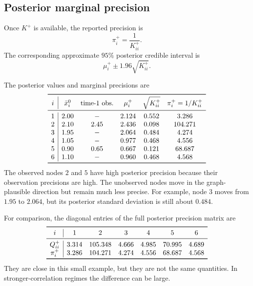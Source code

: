 \documentclass[11pt]{article}
\numberwithin{equation}{section}
\begin{document}
\subsection{Posterior marginal precision}

Once $K^+$ is available, the reported precision is
\begin{equation}
  \boxed{\pi_i^+=\frac{1}{K^+_{ii}}.}
  \label{eq:marginal-precision-final}
\end{equation}
The corresponding approximate $95\%$ posterior credible interval is
\begin{equation}
  \mu_i^+\pm1.96\sqrt{K^+_{ii}}.
  \label{eq:credible-interval}
\end{equation}

\begin{runningexample}
The posterior values and marginal precisions are
\[
\begin{array}{c|ccccc}
\toprule
 i&\bar x_i^0&\text{time-1 obs.}&\mu_i^+&\sqrt{K^+_{ii}}&\pi_i^+=1/K^+_{ii}\\
\midrule
1&2.00&-&2.124&0.552&  3.286\\
2&2.10&2.45&2.436&0.098&104.271\\
3&1.95&-&2.064&0.484&  4.274\\
4&1.05&-&0.977&0.468&  4.556\\
5&0.90&0.65&0.667&0.121& 68.687\\
6&1.10&-&0.960&0.468&  4.568\\
\bottomrule
\end{array}
\]
The observed nodes $2$ and $5$ have high posterior precision because their observation precisions are high.  The unobserved nodes move in the graph-plausible direction but remain much less precise.  For example, node $3$ moves from $1.95$ to $2.064$, but its posterior standard deviation is still about $0.484$.

For comparison, the diagonal entries of the full posterior precision matrix are
\[
\begin{array}{c|cccccc}
\toprule
 i&1&2&3&4&5&6\\
\midrule
 Q^+_{ii}&3.314&105.348&4.666&4.985&70.995&4.689\\
 \pi_i^+&3.286&104.271&4.274&4.556&68.687&4.568\\
\bottomrule
\end{array}
\]
They are close in this small example, but they are not the same quantities.  In stronger-correlation regimes the difference can be large.
\end{runningexample}
\end{document}
